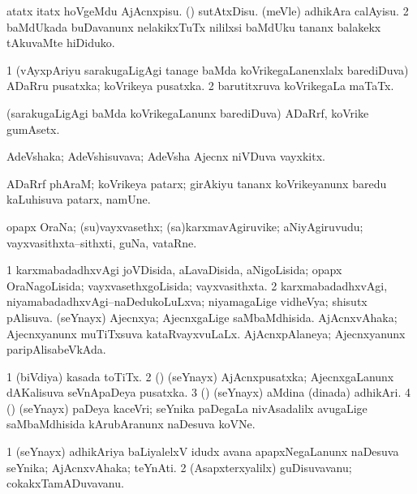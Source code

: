 \noindent
\gl{\pagu}
\bmng
\bnum
{}  
\banum
{} atatx itatx hoVgeMdu AjAcnxpisu. 
 (\rUpa) sutAtxDisu. 
 (meVle) adhikAra calAyisu. 
\eanum
\numie
\num{2}  baMdUkada buDavanunx nelakikxTuTx nililxsi baMdUku tananx balakekx tAkuvaMte hiDiduko. 
\enum
\emng
\eentry

\bentry
{}
\gl{\nA}
\bmng
\bnum
\num{1} (vAyxpAriyu sarakugaLigAgi tanage baMda koVrikegaLanenxlalx barediDuva) ADaRru pusatxka; koVrikeya pusatxka. 
\num{2} barutitxruva koVrikegaLa maTaTx. 
\enum
\emng
\eentry

\bentry
{}
\gl{\nA}
\bmng
(sarakugaLigAgi baMda koVrikegaLanunx barediDuva) ADaRrf, koVrike gumAsetx. 
\emng
\eentry

\bentry
{}
\gl{\nA}
\bmng
AdeVshaka; AdeVshisuvava; AdeVsha Ajecnx niVDuva vayxkitx. 
\emng
\eentry

\bentry
{}
\gl{\nA}
\bmng
ADaRrf phAraM; koVrikeya patarx; girAkiyu tananx koVrikeyanunx baredu kaLuhisuva patarx, namUne. 
\emng
\eentry

\bentry
{}
\gl{\nA}
\bmng
opapx OraNa; (su)vayxvasethx; (sa)karxmavAgiruvike; aNiyAgiruvudu; vayxvasithxta--sithxti, guNa, vataRne. 
\emng
\eentry

\bentry
{}
\gl{\gu}
\bmng
\bnum
\num{1} karxmabadadhxvAgi joVDisida, aLavaDisida, aNigoLisida; opapx OraNagoLisida; vayxvasethxgoLisida; vayxvasithxta. 
\num{2} karxmabadadhxvAgi, niyamabadadhxvAgi--naDedukoLuLxva; niyamagaLige vidheVya; shisutx pAlisuva. 
 (seYnayx) 
\banum
{} Ajecnxya; AjecnxgaLige saMbaMdhisida. 
 AjAcnxvAhaka; Ajecnxyanunx muTiTxsuva kataRvayxvuLaLx. 
 AjAcnxpAlaneya; Ajecnxyanunx paripAlisabeVkAda. 
\eanum
\numie
\enum
\emng

\noindent
\gl{\pagu}
\bmng
\bnum
\num{1}  (biVdiya) kasada toTiTx. 
\num{2}  (\birx) (seYnayx) AjAcnxpusatxka; AjecnxgaLanunx dAKalisuva seVnApaDeya pusatxka. 
\num{3}  (\birx) (seYnayx) aMdina (dinada) adhikAri. 
\num{4}  (\birx) (seYnayx) paDeya kaceVri; seYnika paDegaLa nivAsadalilx avugaLige saMbaMdhisida kArubAranunx naDesuva koVNe. 
\enum
\emng
\eentry

\bentry
{}
\gl{\nA}
\bmng
\bnum
\num{1} (seYnayx) adhikAriya baLiyalelxV idudx avana apapxNegaLanunx naDesuva seYnika; AjAcnxvAhaka; teYnAti. 
\num{2} (Asapxterxyalilx) guDisuvavanu; cokakxTamADuvavanu. 
\enum
\emng
\eentry

